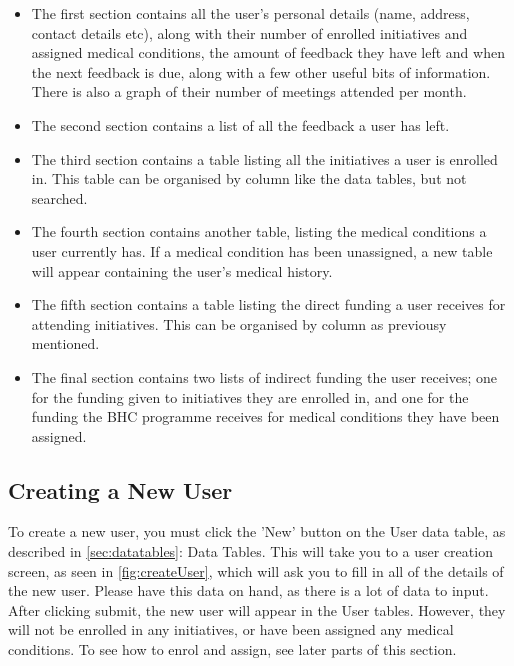\documentclass{bhcguides}
\begin{document}
\begin{itemize}
	\item The first section contains all the user's personal details (name, address, contact details etc), along with their number of enrolled initiatives and assigned medical conditions, the amount of feedback they have left and when the next feedback is due, along with a few other useful bits of information. There is also a graph of their number of meetings attended per month.
	\item The second section contains a list of all the feedback a user has left.
	\item The third section contains a table listing all the initiatives a user is enrolled in. This table can be organised by column like the data tables, but not searched.
	\item The fourth section contains another table, listing the medical conditions a user currently has. If a medical condition has been unassigned, a new table will appear containing the user's medical history.
	\item The fifth section contains a table listing the direct funding a user receives for attending initiatives. This can be organised by column as previousy mentioned.
	\item The final section contains two lists of indirect funding the user receives; one for the funding given to initiatives they are enrolled in, and one for the funding the BHC programme receives for medical conditions they have been assigned.
\end{itemize}

\subsection{Creating a New User}
\label{ssec:createuser}

To create a new user, you must click the 'New' button on the User data table, as described in \autoref{sec:datatables}: Data Tables. This will take you to a user creation screen, as seen in \autoref{fig:createUser}, which will ask you to fill in all of the details of the new user. Please have this data on hand, as there is a lot of data to input. After clicking submit, the new user will appear in the User tables. However, they will not be enrolled in any initiatives, or have been assigned any medical conditions. To see how to enrol and assign, see later parts of this section.
\end{document}
